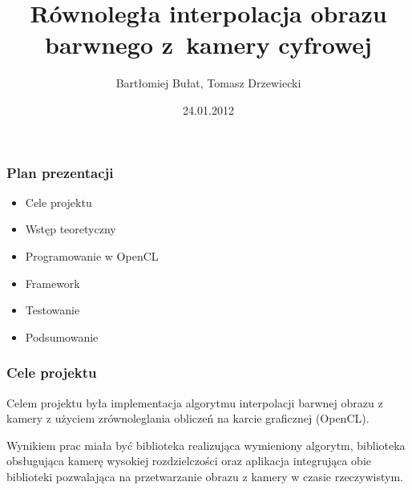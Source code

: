\documentclass{beamer}
\title[Interpolacja barwna obrazu]{Równoległa interpolacja obrazu barwnego
  z~kamery cyfrowej}
\author[B. Bułat, T. Drzewiecki]{Bartłomiej Bułat, Tomasz Drzewiecki}
\date[2011]{24.01.2012}
\institute[AGH]
{Wydział EAIiIB\\ 
Katedra Automatyki i Inżynierii Biomedycznej
}
\begin{document}
{
 \begin{frame}
   \titlepage
 \end{frame}
}



\begin{frame}
\frametitle{Plan prezentacji}
	
  \begin{itemize}
  	\item Cele projektu
	  \item Wstęp teoretyczny
  	\item Programowanie w OpenCL
  	\item Framework
	\item Testowanie
  	\item Podsumowanie
	\end{itemize}

\end{frame}

\begin{frame}
	\frametitle{Cele projektu}
	
  Celem projektu była implementacja algorytmu interpolacji barwnej obrazu z kamery
  z użyciem zrównoleglania obliczeń na karcie graficznej (OpenCL). 
  
  Wynikiem prac miała być
  biblioteka realizująca wymieniony algorytm, biblioteka obsługująca kamerę wysokiej rozdzielczości
  oraz aplikacja integrująca obie biblioteki pozwalająca na przetwarzanie obrazu z kamery w czasie 
  rzeczywistym.  
\end{frame}
\end{document}
